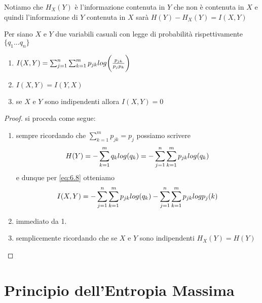 Notiamo che $H_X(Y)$ è l'informazione contenuta in $Y$ che non è contenuta in $X$ e quindi l'informazione di $Y$ contenuta in $X$ sarà $H(Y)-H_X(Y)=I(X,Y)$
\begin{teo} \label{teo:6.7}
Per siano $X$ e $Y$ due variabili casuali con legge di probabilità rispettivamente \lep $\{q_1...q_n \}$
\begin{enumerate}
\item $I(X,Y)=\sum_{j=1}^n \sum_{k=1}^m p_{jk}log \bigg( \frac{p_{jk}}{p_j p_k} \bigg)$
\item $I(X,Y)=I(Y,X)$
\item se $X$ e $Y$ sono indipendenti allora $I(X,Y)=0$
\end{enumerate}
\end{teo}
\begin{proof}
si proceda come segue:
\begin{enumerate}
\item sempre ricordando che $\sum_{k=1}^m p_{jk}=p_j$ possiamo scrivere 
$$H(Y)=-\sum_{k=1}^m q_{k}log (q_k)=-\sum_{j=1}^n \sum_{k=1}^m p_{jk} log (q_k)$$
e dunque per \ref{eq:6.8} otteniamo
$$I(X,Y)=-\sum_{j=1}^n \sum_{k=1}^m p_{jk}log(q_k)-\sum_{j=1}^n \sum_{k=1}^m p_{jk}log{p_j(k)}$$
\item immediato da 1.
\item semplicemente ricordando che se $X$ e $Y$ sono indipendenti $H_X(Y)=H(Y)$
\end{enumerate}
\end{proof}


\section{Principio dell'Entropia Massima}
\label{sec:maxEntropia}

